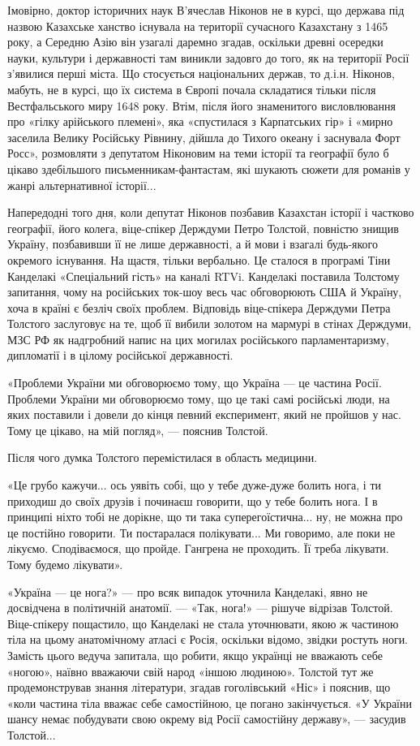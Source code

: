 Імовірно, доктор історичних наук В’ячеслав Ніконов не в курсі, що держава під
назвою Казахське ханство існувала на території сучасного Казахстану з 1465
року, а Середню Азію він узагалі даремно згадав, оскільки древні осередки
науки, культури і державності там виникли задовго до того, як на території
Росії з’явилися перші міста. Що стосується національних держав, то д.і.н.
Ніконов, мабуть, не в курсі, що їх система в Європі почала складатися тільки
після Вестфальського миру 1648 року.  Втім, після його знаменитого
висловлювання про «гілку арійського племені», яка «спустилася з Карпатських
гір» і «мирно заселила Велику Російську Рівнину, дійшла до Тихого океану і
заснувала Форт Росс», розмовляти з депутатом Ніконовим на теми історії та
географії було б цікаво здебільшого письменникам-фантастам, які шукають сюжети
для романів у жанрі альтернативної історії...

Напередодні того дня, коли депутат Ніконов позбавив Казахстан історії і
частково географії, його колега, віце-спікер Держдуми Петро Толстой, повністю
знищив Україну, позбавивши її не лише державності, а й мови і взагалі
будь-якого окремого існування. На щастя, тільки вербально.  Це сталося в
програмі Тіни Канделакі «Спеціальний гість» на каналі RTVi.  Канделакі
поставила Толстому запитання, чому на російських ток-шоу весь час обговорюють
США й Україну, хоча в країні є безліч своїх проблем.  Відповідь віце-спікера
Держдуми Петра Толстого заслуговує на те, щоб її вибили золотом на мармурі в
стінах Держдуми, МЗС РФ як надгробний напис на цих могилах російського
парламентаризму, дипломатії і в цілому російської державності.

«Проблеми України ми обговорюємо тому, що Україна — це частина Росії.  Проблеми
України ми обговорюємо тому, що це такі самі російські люди, на яких поставили
і довели до кінця певний експеримент, який не пройшов у нас.  Тому це цікаво,
на мій погляд», — пояснив Толстой.

Після чого думка Толстого перемістилася в область медицини.

«Це грубо кажучи... ось уявіть собі, що у тебе дуже-дуже болить нога, і ти
приходиш до своїх друзів і починаєш говорити, що у тебе болить нога. І в
принципі ніхто тобі не дорікне, що ти така суперегоїстична... ну, не можна про
це постійно говорити. Ти постаралася полікувати... Ми говоримо, але поки не
лікуємо. Сподіваємося, що пройде. Гангрена не проходить. Її треба лікувати.
Тому будемо лікувати».

«Україна — це нога?» — про всяк випадок уточнила Канделакі, явно не досвідчена
в політичній анатомії. — «Так, нога!» — рішуче відрізав Толстой. Віце-спікеру
пощастило, що Канделакі не стала уточнювати, якою ж частиною тіла на цьому
анатомічному атласі є Росія, оскільки відомо, звідки ростуть ноги. Замість
цього ведуча запитала, що робити, якщо українці не вважають себе «ногою»,
наївно вважаючи свій народ «іншою людиною». Толстой тут же продемонстрував
знання літератури, згадав гоголівський «Ніс» і пояснив, що «коли частина тіла
вважає себе самостійною, це погано закінчується.  «У України шансу немає
побудувати свою окрему від Росії самостійну державу», — засудив Толстой...

